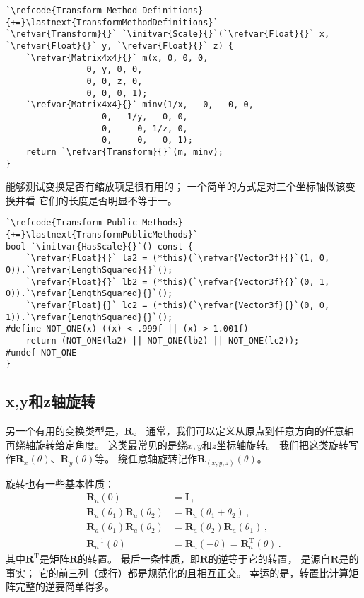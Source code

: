 \begin{lstlisting}
`\refcode{Transform Method Definitions}{+=}\lastnext{TransformMethodDefinitions}`
`\refvar{Transform}{}` `\initvar{Scale}{}`(`\refvar{Float}{}` x, `\refvar{Float}{}` y, `\refvar{Float}{}` z) {
    `\refvar{Matrix4x4}{}` m(x, 0, 0, 0,
                0, y, 0, 0,
                0, 0, z, 0,
                0, 0, 0, 1);
    `\refvar{Matrix4x4}{}` minv(1/x,   0,   0, 0,
                   0,   1/y,   0, 0,
                   0,     0, 1/z, 0,
                   0,     0,   0, 1);
    return `\refvar{Transform}{}`(m, minv);
}
\end{lstlisting}

能够测试变换是否有缩放项是很有用的；
一个简单的方式是对三个坐标轴做该变换并看
它们的长度是否明显不等于一。
\begin{lstlisting}
`\refcode{Transform Public Methods}{+=}\lastnext{TransformPublicMethods}`
bool `\initvar{HasScale}{}`() const {
    `\refvar{Float}{}` la2 = (*this)(`\refvar{Vector3f}{}`(1, 0, 0)).`\refvar{LengthSquared}{}`();
    `\refvar{Float}{}` lb2 = (*this)(`\refvar{Vector3f}{}`(0, 1, 0)).`\refvar{LengthSquared}{}`();
    `\refvar{Float}{}` lc2 = (*this)(`\refvar{Vector3f}{}`(0, 0, 1)).`\refvar{LengthSquared}{}`();
#define NOT_ONE(x) ((x) < .999f || (x) > 1.001f)
    return (NOT_ONE(la2) || NOT_ONE(lb2) || NOT_ONE(lc2));
#undef NOT_ONE
}
\end{lstlisting}

\subsection{x,y和z轴旋转}\label{sub:x,y和z轴旋转}
另一个有用的变换类型是，$\bm R$。
通常，我们可以定义从原点到任意方向的任意轴再绕轴旋转给定角度。
这类最常见的是绕$x,y$和$z$坐标轴旋转。
我们把这类旋转写作$\bm R_x(\theta)$、$\bm R_y(\theta)$等。
绕任意轴旋转记作$\bm R_{(x,y,z)}(\theta)$。

旋转也有一些基本性质：
\begin{align*}
    \bm R_a(0)                         & =\bm I\, ,                                       \\
    \bm R_a(\theta_1)\bm R_a(\theta_2) & =\bm R_a(\theta_1+\theta_2)\, ,                  \\
    \bm R_a(\theta_1)\bm R_a(\theta_2) & =\bm R_a(\theta_2)\bm R_a(\theta_1)\, ,          \\
    \bm R_a^{-1}(\theta)               & =\bm R_a(-\theta)=\bm R_a^\mathrm{T}(\theta)\, .
\end{align*}
其中$\bm R^\mathrm{T}$是矩阵$\bm R$的转置。
最后一条性质，即$\bm R$的逆等于它的转置，
是源自$\bm R$是的事实；
它的前三列（或行）都是规范化的且相互正交。
幸运的是，转置比计算矩阵完整的逆要简单得多。

